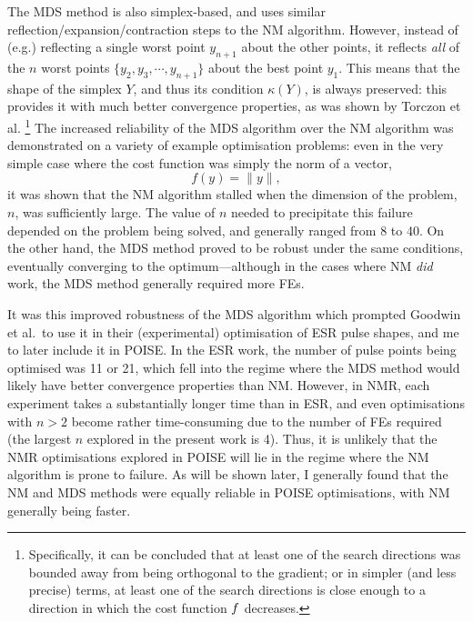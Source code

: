 The MDS method is also simplex-based, and uses similar reflection/expansion/contraction steps to the NM algorithm.
However, instead of (e.g.) reflecting a single worst point $y_{n+1}$ about the other points, it reflects \textit{all} of the $n$ worst points $\{y_2, y_3, \cdots, y_{n+1}\}$ about the best point $y_1$.
This means that the shape of the simplex $Y$, and thus its condition $\kappa(Y)$, is always preserved: this provides it with much better convergence properties, as was shown by Torczon et al.\autocite{Torczon1989,Torczon1991SIAMJO}%
\footnote{Specifically, it can be concluded that at least one of the search directions was bounded away from being orthogonal to the gradient; or in simpler (and less precise) terms, at least one of the search directions is close enough to a direction in which the cost function $f\/$ decreases.}
The increased reliability of the MDS algorithm over the NM algorithm was demonstrated on a variety of example optimisation problems: even in the very simple case where the cost function was simply the norm of a vector,
\begin{equation}
    \label{eq:norm_cf}
    f(y) = \lVert y \rVert,
\end{equation}
it was shown that the NM algorithm stalled when the dimension of the problem, $n$, was sufficiently large.
The value of $n$ needed to precipitate this failure depended on the problem being solved, and generally ranged from 8 to 40.
On the other hand, the MDS method proved to be robust under the same conditions, eventually converging to the optimum---although in the cases where NM \textit{did} work, the MDS method generally required more FEs.

It was this improved robustness of the MDS algorithm which prompted Goodwin et al.\ to use it in their (experimental) optimisation of ESR pulse shapes\autocite{Goodwin2018JMR}, and me to later include it in POISE.
In the ESR work, the number of pulse points being optimised was 11 or 21, which fell into the regime where the MDS method would likely have better convergence properties than NM.
However, in NMR, each experiment takes a substantially longer time than in ESR, and even optimisations with $n > 2$ become rather time-consuming due to the number of FEs required (the largest $n$ explored in the present work is 4).
Thus, it is unlikely that the NMR optimisations explored in POISE will lie in the regime where the NM algorithm is prone to failure.
As will be shown later, I generally found that the NM and MDS methods were equally reliable in POISE optimisations, with NM generally being faster.
